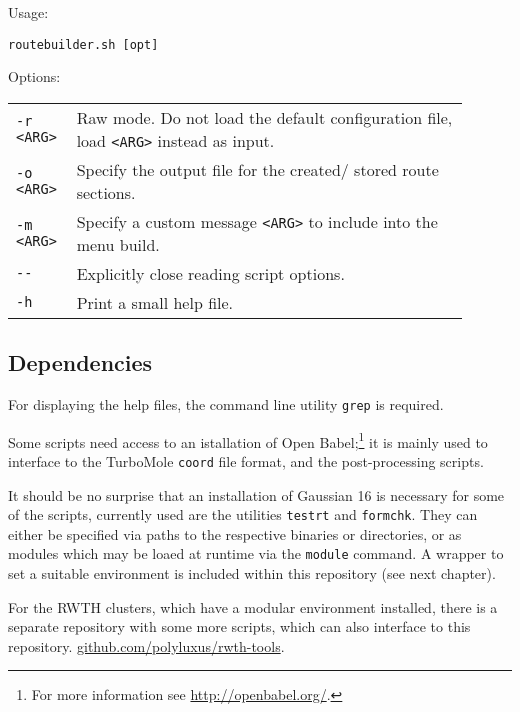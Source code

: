 \documentclass[   %
  final,          %
  a4paper         %
]{article}
\begin{document}
Usage: 

\lstinline`routebuilder.sh [opt]`

Options:

\begin{tabular}{p{0.1\linewidth}p{0.8\linewidth}}
  {\lstinline`-r <ARG>`} & Raw mode. 
    Do not load the default configuration file, load \lstinline`<ARG>` instead as input.\\
  {\lstinline`-o <ARG>`} & Specify the output file for the created/ stored route sections.\\
  {\lstinline`-m <ARG>`} & Specify a custom message \lstinline`<ARG>` to include into the menu build.\\
  {\lstinline`--`}       & Explicitly close reading script options. \\
  {\lstinline`-h`}       & Print a small help file. \\
\end{tabular}


\subsection{Dependencies}

For displaying the help files, the command line utility \texttt{grep} is required.

Some scripts need access to an istallation of Open Babel;\footnote{%
  For more information see \href{http://openbabel.org/}{http://openbabel.org/}.}
it is mainly used to interface to the TurboMole \texttt{coord} file format,
and the post-processing scripts.

It should be no surprise that an installation of Gaussian 16 is necessary for
some of the scripts, currently used are the utilities \texttt{testrt} and \texttt{formchk}.
They can either be specified via paths to the respective binaries or directories,
or as modules which may be loaed at runtime via the \texttt{module} command.
A wrapper to set a suitable environment is included within this repository (see next chapter).

For the RWTH clusters, which have a modular environment installed, 
there is a separate repository with some more scripts, 
which can also interface to this repository.
\href{https://github.com/polyluxus/rwth-tools}{github.com/polyluxus/rwth-tools}.
\end{document}

